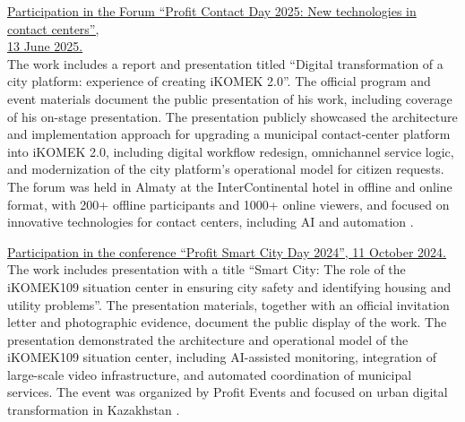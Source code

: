 \bigskip

\noindent\underline{Participation in the Forum ``Profit Contact Day 2025: New technologies in contact centers'',} \\
\noindent\underline{13 June 2025.} \\
The work includes a report and presentation titled ``Digital transformation of a city platform: experience of creating iKOMEK 2.0''. The official program and event materials document the public presentation of his work, including coverage of his on-stage presentation. The presentation publicly showcased the architecture and implementation approach for upgrading a municipal contact-center platform into iKOMEK 2.0, including digital workflow redesign, omnichannel service logic, and modernization of the city platform’s operational model for citizen requests. The forum was held in Almaty at the InterContinental hotel in offline and online format, with 200+ offline participants and 1000+ online viewers, and focused on innovative technologies for contact centers, including AI and automation .

\bigskip

\noindent\underline{Participation in the conference ``Profit Smart City Day 2024'', 11 October 2024.} \\
The work includes presentation with a title ``Smart City: The role of the iKOMEK109 situation center in ensuring city safety and identifying housing and utility problems''. The presentation materials, together with an official invitation letter and photographic evidence, document the public display of the work. The presentation demonstrated the architecture and operational model of the iKOMEK109 situation center, including AI-assisted monitoring, integration of large-scale video infrastructure, and automated coordination of municipal services. The event was organized by Profit Events and focused on urban digital transformation in Kazakhstan .

\bigskip

